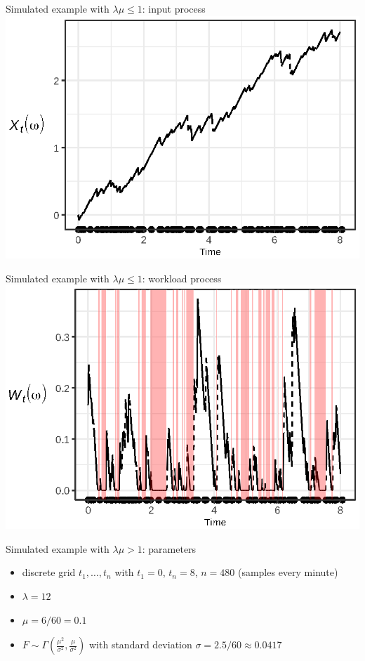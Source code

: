 \documentclass{beamer}
\begin{document}
\begin{frame}[plain]{Simulated example with $\lambda \mu \leq 1$: input process}
  \includegraphics{input_leq_1_prsnt}
\end{frame}

\begin{frame}{Simulated example with $\lambda \mu \leq 1$: workload process}
  \includegraphics{workload_leq_1_prsnt}
\end{frame}

\begin{frame}[plain]{Simulated example with $\lambda \mu > 1$: parameters}
  \begin{itemize}
    \item discrete grid $t_1, \dots, t_n$ with $t_1 = 0$, $t_n = 8$, $n = 480$ (samples every minute)
    \item $\lambda = 12$
    \item $\mu = 6 / 60 = 0.1$
    \item $F \sim \Gamma(\frac{\mu^2}{\sigma^2}, \frac{\mu}{\sigma^2})$ with standard deviation $\sigma = 2.5 / 60 \approx 0.0417$ 
  \end{itemize}
\end{frame}
\end{document}
